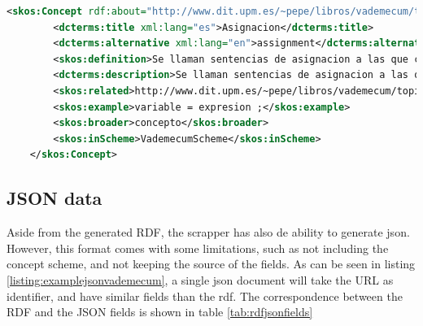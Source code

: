 \begin{center} 
  \begin{lstlisting}[language=XML, captionpos=b, caption=Example extractor, label=listing:examplerdfvademecum]   
    <skos:Concept rdf:about="http://www.dit.upm.es/~pepe/libros/vademecum/topics/26.html">
        <dcterms:title xml:lang="es">Asignacion</dcterms:title>
        <dcterms:alternative xml:lang="en">assignment</dcterms:alternative>
        <skos:definition>Se llaman sentencias de asignacion a las que cargan un nuevo valor en una variable</skos:definition>
        <dcterms:description>Se llaman sentencias de asignacion a las que cargan un nuevo valor en una variable: El tipo de la variable debe ser igual al de la expresion en tipos primitivos: asignable por promocion (ver \" Promocion\") asignable por reduccion (ver \" Reduccion\") en objetos: asignable por Upcasting (ver \"Casting\") asignable por Downcasting (ver \"Casting\")</dcterms:description>
        <skos:related>http://www.dit.upm.es/~pepe/libros/vademecum/topics/122.html</skos:related> <skos:related>http://www.dit.upm.es/~pepe/libros/vademecum/topics/242.html</skos:related> <skos:related>http://www.dit.upm.es/~pepe/libros/vademecum/topics/247.html</skos:related> <skos:related>http://www.dit.upm.es/~pepe/libros/vademecum/topics/288.html</skos:related> <skos:related>http://www.dit.upm.es/~pepe/libros/vademecum/topics/47.html</skos:related> <skos:related>http://www.dit.upm.es/~pepe/libros/vademecum/topics/86.html</skos:related> <skos:related>http://www.dit.upm.es/~pepe/libros/vademecum/topics/47.html</skos:related> <skos:related>http://www.dit.upm.es/~pepe/libros/vademecum/topics/3.html</skos:related> <skos:related>http://www.dit.upm.es/~pepe/libros/vademecum/topics/27.html</skos:related> <skos:related>http://www.dit.upm.es/~pepe/libros/vademecum/topics/28.html</skos:related> 
        <skos:example>variable = expresion ;</skos:example>
        <skos:broader>concepto</skos:broader>        
        <skos:inScheme>VademecumScheme</skos:inScheme>
    </skos:Concept>
 \end{lstlisting}
\end{center}


\subsection{JSON data}

Aside from the generated RDF, the scrapper has also de ability to generate json. However, this format comes with some limitations, such as not including the concept scheme, and not keeping the source of the fields. As can be seen in listing \ref{listing:examplejsonvademecum}, a single json document will take the URL as identifier, and have similar fields than the rdf. The correspondence between the RDF and the JSON fields is shown in table \ref{tab:rdfjsonfields}



